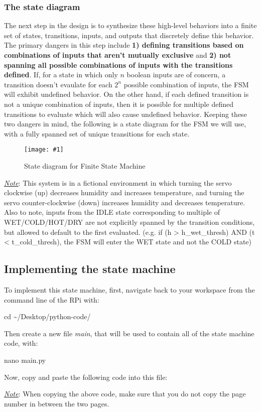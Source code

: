 \documentclass{article}
\newcommand*{\myfont}{\fontfamily{pcr}\selectfont}
\newcommand{\codeb}[2]{
  \begin{tcolorbox}[width=\textwidth,colback={SpringGreen},title={#1},colbacktitle=DarkGreen,coltitle=SpringGreen]
    \myfont
    #2
  \end{tcolorbox}
} %
\newcommand{\imagefigb}[2]{
    \begin{figure}[H]
        \centering
        \texttt{[image: \#1]}
        \caption{#2}
    \end{figure}
}
\newcommand{\note}[1]{\underline{\textit{Note}}: #1}
\begin{document}
    \subsubsection{The state diagram}
      The next step in the design is to synthesize these high-level behaviors into a finite set of states, transitions, inputs, and outputs that discretely define this behavior. The primary dangers in this step include \textbf{1) defining transitions based on combinations of inputs that aren't mutually exclusive} and \textbf{2) not spanning all possible combinations of inputs with the transitions defined}. If, for a state in which only $n$ boolean inputs are of concern, a transition doesn't evaulate for each $2^n$ possible combination of inputs, the FSM will exhibit undefined behavior. On the other hand, if each defined transition is not a unique combination of inputs, then it is possible for multiple defined transitions to evaluate which will also cause undefined behavior. Keeping these two dangers in mind, the following is a state diagram for the FSM we will use, with a fully spanned set of unique transitions for each state.
      \imagefigb{fsm-slab.png}{State diagram for Finite State Machine}
      \noindent
      \note{This system is in a fictional environment in which turning the servo clockwise (up) decreases humidity and increases temperature, and turning the servo counter-clockwise (down) increases humidity and decreases temperature. Also to note, inputs from the IDLE state corresponding to multiple of WET/COLD/HOT/DRY are not explicitly spanned by the transition conditions, but allowed to default to the first evaluated. (e.g. if (h > h\_wet\_thresh) AND (t < t\_cold\_thresh), the FSM will enter the WET state and not the COLD state)}
  \subsection{Implementing the state machine}
    To implement this state machine, first, navigate back to your workspace from the command line of the RPi with:
    \codeb{Navigate to your workpsace}
    {
      cd \textasciitilde/Desktop/python-code/
    }
    Then create a new file \textit{main}, that will be used to contain all of the state machine code, with:
    \codeb{Create main Python FSM file}
    {
      nano main.py
    }
    Now, copy and paste the following code into this file:

    
    \underline{\textit{Note}}: When copying the above code, make sure that you do not copy the page number in between the two pages.
\end{document}
